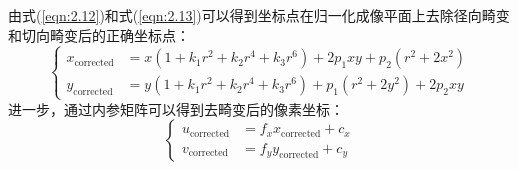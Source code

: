 由式(\ref{eqn:2.12})和式(\ref{eqn:2.13})可以得到坐标点在归一化成像平面上去除径向畸变和切向畸变后的正确坐标点：
\begin{equation}
\label{eqn:2.14}
\left\{
\begin{aligned}
x_{\text {corrected}}&=x\left(1+k_{1} r^{2}+k_{2} r^{4}+k_{3} r^{6}\right)+2 p_{1} x y+p_{2}\left(r^{2}+2 x^{2}\right) \\ 
y_{\text {corrected}}&=y\left(1+k_{1} r^{2}+k_{2} r^{4}+k_{3} r^{6}\right)+p_{1}\left(r^{2}+2 y^{2}\right)+2 p_{2} x y
\end{aligned}
\right.
\end{equation}
进一步，通过内参矩阵可以得到去畸变后的像素坐标：
\begin{equation}
\label{eqn:2.15}
\left\{
\begin{aligned}
u_{\text {corrected}}&=f_{x} x_{\text {corrected}}+c_{x} \\ 
v_{\text {corrected}}&=f_{y} y_{\text {corrected}}+c_{y}
\end{aligned}
\right.
\end{equation}
